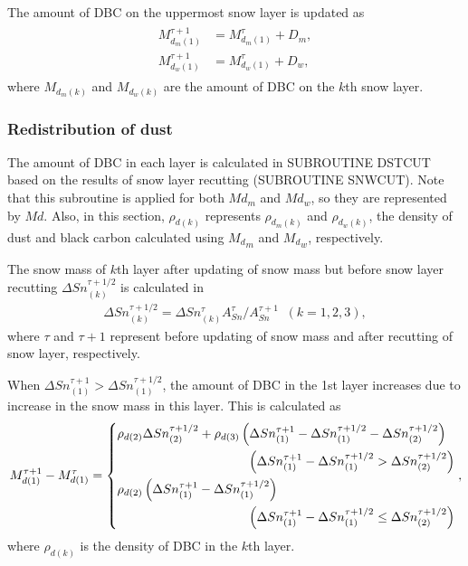 The amount of DBC on the uppermost snow layer is updated as \begin{eqnarray}
\begin{aligned}
M_{d_m(1)}^{\tau+1} &= M_{d_m(1)}^{\tau} + D_m, \\
M_{d_w(1)}^{\tau+1} &= M_{d_w(1)}^{\tau} + D_w,
\end{aligned} \label{8-48}
\end{eqnarray} where \(M_{d_m(k)}\) and \(M_{d_w(k)}\) are the amount of DBC on the \(k\)th snow layer.

\subsubsection{Redistribution of dust}\label{redistribution-of-dust}

The amount of DBC in each layer is calculated in SUBROUTINE DSTCUT based on the results of snow layer recutting (SUBROUTINE SNWCUT). Note that this subroutine is applied for both \(Md_m\) and
\(Md_w\), so they are represented by \(Md\). Also, in this section, \(\rho_{d(k)}\) represents \(\rho_{d_m(k)}\) and \(\rho_{d_w(k)}\), the density of dust and black carbon calculated using
\({M_d}_m\) and \({M_d}_w\), respectively.

The snow mass of \(k\)th layer after updating of snow mass but before snow layer recutting \(\Delta Sn^{\tau+1/2}_{(k)}\) is calculated in \begin{eqnarray}
\Delta Sn^{\tau+1/2}_{(k)} = \Delta Sn^{\tau}_{(k)} A_{Sn}^{\tau} / A_{Sn}^{\tau+1} \;\; (k = 1, 2, 3), \label{8-49}
\end{eqnarray} where \(\tau\) and \(\tau+1\) represent before updating of snow mass and after recutting of snow layer, respectively.

When \(\Delta Sn^{\tau+1}_{(1)} > \Delta Sn^{\tau+1/2}_{(1)}\), the amount of DBC in the 1st layer increases due to increase in the snow mass in this layer. This is calculated as \begin{eqnarray}
M_{d(1)}^{\tau+1} - M_{d(1)}^{\tau}
 = \left\{ \begin{aligned}
 & \rho_{d(2)} \Delta Sn^{\tau+1/2}_{(2)}
 + \rho_{d(3)} \left( \Delta Sn^{\tau+1}_{(1)} - \Delta Sn^{\tau+1/2}_{(1)} - \Delta Sn^{\tau+1/2}_{(2)} \right) \\
 & \hspace{36mm}
 \left( \Delta Sn^{\tau+1}_{(1)} - \Delta Sn^{\tau+1/2}_{(1)} > \Delta Sn^{\tau+1/2}_{(2)} \right) \\
 & \rho_{d(2)} \left( \Delta Sn^{\tau+1}_{(1)} - \Delta Sn^{\tau+1/2}_{(1)} \right) \\
 & \hspace{36mm}
 \left( \Delta Sn^{\tau+1}_{(1)} - \Delta Sn^{\tau+1/2}_{(1)} \leq \Delta Sn^{\tau+1/2}_{(2)} \right)
\end{aligned} \right., \label{8-50}
\end{eqnarray} where \(\rho_{d(k)}\) is the density of DBC in the \(k\)th layer.

